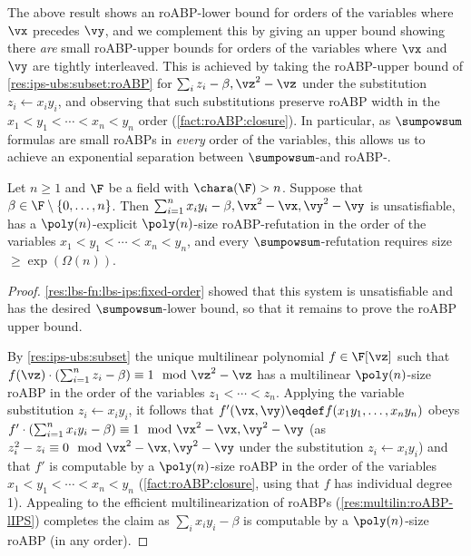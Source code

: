 \documentclass{toc}
\begin{document}
The above result shows an roABP-\lIPS lower bound for orders of the variables where $\vx$ precedes $\vy$, and we complement this by giving an upper bound showing there \emph{are} small roABP-\lIPS upper bounds for orders of the variables where $\vx$ and $\vy$ are tightly interleaved.  This is achieved by taking the roABP-\lIPS upper bound of \autoref{res:ips-ubs:subset:roABP} for $\sum_i z_i-\beta,\vz^2-\vz$ under the substitution $z_i\leftarrow x_iy_i$, and observing that such substitutions preserve roABP width in the $x_1<y_1<\cdots<x_n<y_n$ order (\autoref{fact:roABP:closure}). In particular, as $\sumpowsum$ formulas are small roABPs in \emph{every} order of the variables, this allows us to achieve an exponential separation between $\sumpowsum$-\lIPS and roABP-\lIPS.

\begin{corollary}\label{res:lbs-fn:lbs-ips:order-sep}
        Let $n\ge 1$ and $\F$ be a field with $\chara(\F)>n$.  Suppose that $\beta\in \F\setminus\{0,\ldots,n\}$.  Then $\sum_{i=1}^n x_iy_i-\beta,\vx^2-\vx,\vy^2-\vy$ is unsatisfiable, has a $\poly(n)$-explicit $\poly(n)$-size roABP-\lIPS refutation in the order of the variables $x_1<y_1<\cdots<x_n<y_n$, and every $\sumpowsum$-\lIPS refutation requires size $\ge\exp(\Omega(n))$.
\end{corollary}
\begin{proof}
        \autoref{res:lbs-fn:lbs-ips:fixed-order} showed that this system is unsatisfiable and has the desired $\sumpowsum$-\lIPS lower bound, so that it remains to prove the roABP upper bound.

        By \autoref{res:ips-ubs:subset} the unique multilinear polynomial $f\in\F[\vz]$ such that $f(\vz)\cdot (\sum_{i=1}^nz_i-\beta)\equiv 1\mod \vz^2-\vz$ has a multilinear $\poly(n)$-size roABP in the order of the variables $z_1<\cdots<z_n$. Applying the variable substitution $z_i\leftarrow x_iy_i$, it follows that $f'(\vx,\vy)\eqdef f(x_1y_1,\ldots,x_ny_n)$ obeys $f'\cdot (\sum_{i=1}^nx_iy_i-\beta)\equiv 1 \mod \vx^2-\vx,\vy^2-\vy$ (as $z_i^2-z_i\equiv 0 \mod \vx^2-\vx,\vy^2-\vy$ under the substitution $z_i\leftarrow x_iy_i$) and that $f'$ is computable by a $\poly(n)$-size roABP in the order of the variables $x_1<y_1<\cdots<x_n<y_n$ (\autoref{fact:roABP:closure}, using that $f$ has individual degree 1).  Appealing to the efficient multilinearization of roABPs (\autoref{res:multilin:roABP-lIPS}) completes the claim as $\sum_i x_iy_i -\beta$ is computable by a $\poly(n)$-size roABP (in any order).
\end{proof}
\end{document}
